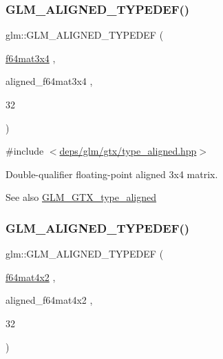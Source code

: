 \subsubsection{\texorpdfstring{G\+L\+M\+\_\+\+A\+L\+I\+G\+N\+E\+D\+\_\+\+T\+Y\+P\+E\+D\+E\+F()}{GLM\_ALIGNED\_TYPEDEF()}\hspace{0.1cm}{\footnotesize\ttfamily [201/209]}}
{\footnotesize\ttfamily glm\+::\+G\+L\+M\+\_\+\+A\+L\+I\+G\+N\+E\+D\+\_\+\+T\+Y\+P\+E\+D\+EF (\begin{DoxyParamCaption}\item[{\hyperlink{group__gtc__type__precision_gaddb7f46e5a007c31348305de542e0d52}{f64mat3x4}}]{,  }\item[{aligned\+\_\+f64mat3x4}]{,  }\item[{32}]{ }\end{DoxyParamCaption})}



{\ttfamily \#include $<$\hyperlink{gtx_2type__aligned_8hpp}{deps/glm/gtx/type\+\_\+aligned.\+hpp}$>$}

Double-\/qualifier floating-\/point aligned 3x4 matrix. \begin{DoxySeeAlso}{See also}
\hyperlink{group__gtx__type__aligned}{G\+L\+M\+\_\+\+G\+T\+X\+\_\+type\+\_\+aligned} 
\end{DoxySeeAlso}
\mbox{\label{group__gtx__type__aligned_ga41e82cd6ac07f912ba2a2d45799dcf0d}} 
\subsubsection{\texorpdfstring{G\+L\+M\+\_\+\+A\+L\+I\+G\+N\+E\+D\+\_\+\+T\+Y\+P\+E\+D\+E\+F()}{GLM\_ALIGNED\_TYPEDEF()}\hspace{0.1cm}{\footnotesize\ttfamily [202/209]}}
{\footnotesize\ttfamily glm\+::\+G\+L\+M\+\_\+\+A\+L\+I\+G\+N\+E\+D\+\_\+\+T\+Y\+P\+E\+D\+EF (\begin{DoxyParamCaption}\item[{\hyperlink{group__gtc__type__precision_ga704001c2ed5838498ff61f55995fed3a}{f64mat4x2}}]{,  }\item[{aligned\+\_\+f64mat4x2}]{,  }\item[{32}]{ }\end{DoxyParamCaption})}



